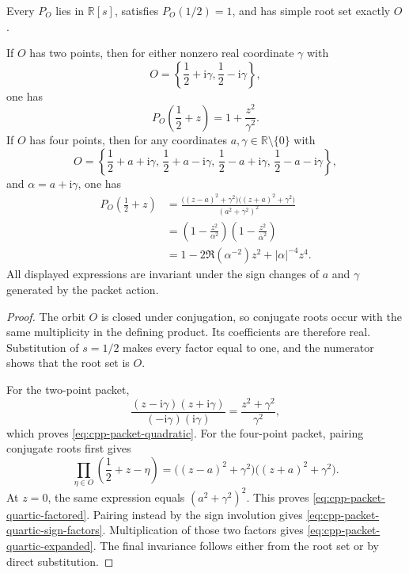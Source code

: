\begin{proposition}
\label{prop:cpp-packet-polynomial-coordinates}
Every \(P_O\) lies in \(\mathbb R[s]\), satisfies \(P_O(1/2)=1\), and has
simple root set exactly \(O\).

If \(O\) has two points, then for either nonzero real coordinate
\(\gamma\) with
\[
 O=\left\{\frac12+\mathrm i\gamma,\frac12-\mathrm i\gamma\right\},
\]
one has
\begin{equation}
\label{eq:cpp-packet-quadratic}
 P_O\!\left(\frac12+z\right)
 =
 1+\frac{z^2}{\gamma^2}.
\end{equation}
If \(O\) has four points, then for any coordinates
\(a,\gamma\in\mathbb R\setminus\{0\}\) with
\[
 O=
 \left\{
 \frac12+a+\mathrm i\gamma,\,
 \frac12+a-\mathrm i\gamma,\,
 \frac12-a+\mathrm i\gamma,\,
 \frac12-a-\mathrm i\gamma
 \right\},
\]
and \(\alpha=a+\mathrm i\gamma\), one has
\begin{align}
\label{eq:cpp-packet-quartic-factored}
 P_O\!\left(\frac12+z\right)
 &=
 \frac{\bigl((z-a)^2+\gamma^2\bigr)
       \bigl((z+a)^2+\gamma^2\bigr)}
      {(a^2+\gamma^2)^2}\\
\label{eq:cpp-packet-quartic-sign-factors}
 &=
 \left(1-\frac{z^2}{\alpha^2}\right)
 \left(1-\frac{z^2}{\overline\alpha^2}\right)\\
\label{eq:cpp-packet-quartic-expanded}
 &=
 1-2\Re(\alpha^{-2})z^2+|\alpha|^{-4}z^4.
\end{align}
All displayed expressions are invariant under the sign changes of \(a\) and
\(\gamma\) generated by the packet action.
\end{proposition}

\begin{proof}
The orbit \(O\) is closed under conjugation, so conjugate roots occur with the
same multiplicity in the defining product.  Its coefficients are therefore
real.  Substitution of \(s=1/2\) makes every factor equal to one, and the
numerator shows that the root set is \(O\).

For the two-point packet,
\[
 \frac{(z-\mathrm i\gamma)(z+\mathrm i\gamma)}
 {(-\mathrm i\gamma)(\mathrm i\gamma)}
 =
 \frac{z^2+\gamma^2}{\gamma^2},
\]
which proves \eqref{eq:cpp-packet-quadratic}.  For the four-point packet,
pairing conjugate roots first gives
\[
 \prod_{\eta\in O}\left(\frac12+z-\eta\right)
 =
 \bigl((z-a)^2+\gamma^2\bigr)
 \bigl((z+a)^2+\gamma^2\bigr).
\]
At \(z=0\), the same expression equals \((a^2+\gamma^2)^2\).  This proves
\eqref{eq:cpp-packet-quartic-factored}.  Pairing instead by the sign
involution gives \eqref{eq:cpp-packet-quartic-sign-factors}.  Multiplication of
those two factors gives \eqref{eq:cpp-packet-quartic-expanded}.  The final
invariance follows either from the root set or by direct substitution.
\end{proof}

